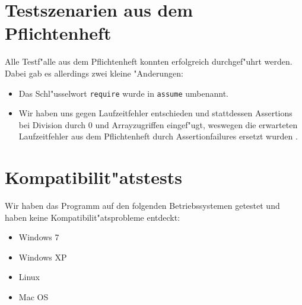 \documentclass[10pt,a4paper,titlepage]{article}
\begin{document}
\section{Testszenarien aus dem Pflichtenheft}
Alle Testf"alle aus dem Pflichtenheft konnten erfolgreich durchgef"uhrt werden. Dabei gab es allerdings zwei kleine "Anderungen: 
\begin{itemize}
\item Das Schl"usselwort \texttt{require} wurde in \texttt{assume} umbenannt.
\item Wir haben uns gegen Laufzeitfehler entschieden und stattdessen Assertions bei Division durch 0 und Arrayzugriffen eingef"ugt, weswegen die erwarteten Laufzeitfehler aus dem Pflichtenheft durch Assertionfailures ersetzt wurden .
\end{itemize}

\section{Kompatibilit"atstests}
Wir haben das Programm auf den folgenden Betriebssystemen getestet und haben keine Kompatibilit"atsprobleme entdeckt:
\begin{itemize}
\item Windows 7
\item Windows XP
\item Linux
\item Mac OS
\end{itemize}
\end{document}
